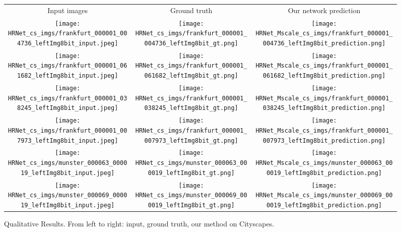 \documentclass{article}
\begin{document}
\begin{figure*}
\centering


\begin{tabular}{ccc}
 \\
 Input images & Ground truth & Our network prediction \\
 \texttt{[image: HRNet\_cs\_imgs/frankfurt\_000001\_004736\_leftImg8bit\_input.jpeg]} & \texttt{[image: HRNet\_cs\_imgs/frankfurt\_000001\_004736\_leftImg8bit\_gt.png]} & \texttt{[image: HRNet\_Mscale\_cs\_imgs/frankfurt\_000001\_004736\_leftImg8bit\_prediction.png]} \\
\texttt{[image: HRNet\_cs\_imgs/frankfurt\_000001\_061682\_leftImg8bit\_input.jpeg]} & \texttt{[image: HRNet\_cs\_imgs/frankfurt\_000001\_061682\_leftImg8bit\_gt.png]} & \texttt{[image: HRNet\_Mscale\_cs\_imgs/frankfurt\_000001\_061682\_leftImg8bit\_prediction.png]} \\
\texttt{[image: HRNet\_cs\_imgs/frankfurt\_000001\_038245\_leftImg8bit\_input.jpeg]} & \texttt{[image: HRNet\_cs\_imgs/frankfurt\_000001\_038245\_leftImg8bit\_gt.png]} & \texttt{[image: HRNet\_Mscale\_cs\_imgs/frankfurt\_000001\_038245\_leftImg8bit\_prediction.png]} \\
\texttt{[image: HRNet\_cs\_imgs/frankfurt\_000001\_007973\_leftImg8bit\_input.jpeg]} & \texttt{[image: HRNet\_cs\_imgs/frankfurt\_000001\_007973\_leftImg8bit\_gt.png]} & \texttt{[image: HRNet\_Mscale\_cs\_imgs/frankfurt\_000001\_007973\_leftImg8bit\_prediction.png]} \\
\texttt{[image: HRNet\_cs\_imgs/munster\_000063\_000019\_leftImg8bit\_input.jpeg]} & \texttt{[image: HRNet\_cs\_imgs/munster\_000063\_000019\_leftImg8bit\_gt.png]} & \texttt{[image: HRNet\_Mscale\_cs\_imgs/munster\_000063\_000019\_leftImg8bit\_prediction.png]} \\
\texttt{[image: HRNet\_cs\_imgs/munster\_000069\_000019\_leftImg8bit\_input.jpeg]} & \texttt{[image: HRNet\_cs\_imgs/munster\_000069\_000019\_leftImg8bit\_gt.png]} & \texttt{[image: HRNet\_Mscale\_cs\_imgs/munster\_000069\_000019\_leftImg8bit\_prediction.png]}

\end{tabular}
\caption{Qualitative Results. From left to right: input, ground truth, our method on Cityscapes.}
\label{fig:cityscapes_results}
\vspace{-0.5cm}
\end{figure*}
\end{document}

